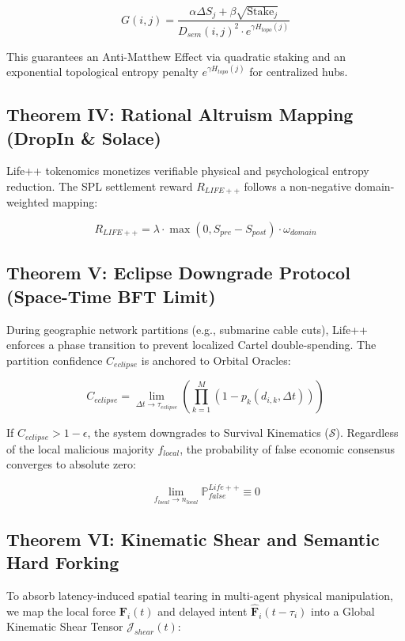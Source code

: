 \documentclass[conference]{IEEEtran}
\begin{document}
\begin{equation}
G(i, j) = \frac{\alpha \Delta S_j + \beta \sqrt{\text{Stake}_j}}{D_{sem}(i, j)^2 \cdot e^{\gamma H_{topo}(j)}}
\end{equation}

This guarantees an Anti-Matthew Effect via quadratic staking and an exponential topological entropy penalty $e^{\gamma H_{topo}(j)}$ for centralized hubs.

\subsection{Theorem IV: Rational Altruism Mapping (DropIn \& Solace)}
Life++ tokenomics monetizes verifiable physical and psychological entropy reduction. The SPL settlement reward $R_{LIFE++}$ follows a non-negative domain-weighted mapping:

\begin{equation}
R_{LIFE++} = \lambda \cdot \max(0, S_{pre} - S_{post}) \cdot \omega_{domain}
\end{equation}

\subsection{Theorem V: Eclipse Downgrade Protocol (Space-Time BFT Limit)}
During geographic network partitions (e.g., submarine cable cuts), Life++ enforces a phase transition to prevent localized Cartel double-spending. The partition confidence $C_{eclipse}$ is anchored to Orbital Oracles:

\begin{equation}
C_{eclipse} = \lim_{\Delta t \to \tau_{eclipse}} \left( \prod_{k=1}^{M} \left( 1 - p_k(d_{i,k}, \Delta t) \right) \right)
\end{equation}

If $C_{eclipse} > 1 - \epsilon$, the system downgrades to Survival Kinematics ($\mathcal{S}$). Regardless of the local malicious majority $f_{local}$, the probability of false economic consensus converges to absolute zero:

\begin{equation}
\lim_{f_{local} \to n_{local}} \mathbb{P}_{false}^{Life++} \equiv 0
\end{equation}

\subsection{Theorem VI: Kinematic Shear and Semantic Hard Forking}
To absorb latency-induced spatial tearing in multi-agent physical manipulation, we map the local force $\mathbf{F}_i(t)$ and delayed intent $\hat{\mathbf{F}}_i(t-\tau_i)$ into a Global Kinematic Shear Tensor $\mathcal{J}_{shear}(t)$:
\end{document}
